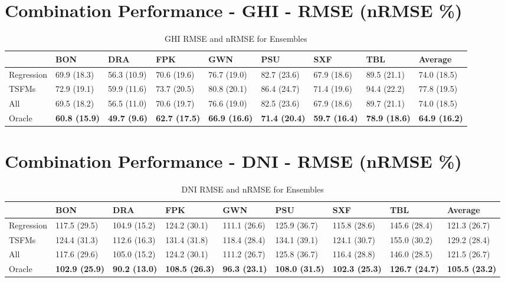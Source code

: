 \section*{Combination Performance - GHI - RMSE (nRMSE \%)}
\begin{table}
\caption{GHI RMSE and nRMSE for Ensembles}
\begin{tabular}{lllllllll}
\toprule
 & BON & DRA & FPK & GWN & PSU & SXF & TBL & Average \\
\midrule
Regression & 69.9 (18.3) & 56.3 (10.9) & 70.6 (19.6) & 76.7 (19.0) & 82.7 (23.6) & 67.9 (18.6) & 89.5 (21.1) & 74.0 (18.5) \\
TSFMs & 72.9 (19.1) & 59.9 (11.6) & 73.7 (20.5) & 80.8 (20.1) & 86.4 (24.7) & 71.4 (19.6) & 94.4 (22.2) & 77.8 (19.5) \\
All & 69.5 (18.2) & 56.5 (11.0) & 70.6 (19.7) & 76.6 (19.0) & 82.5 (23.6) & 67.9 (18.6) & 89.7 (21.1) & 74.0 (18.5) \\
Oracle & \textbf{60.8 (15.9)} & \textbf{49.7 (9.6)} & \textbf{62.7 (17.5)} & \textbf{66.9 (16.6)} & \textbf{71.4 (20.4)} & \textbf{59.7 (16.4)} & \textbf{78.9 (18.6)} & \textbf{64.9 (16.2)} \\
\bottomrule
\end{tabular}
\end{table}

\vspace{1cm}

\section*{Combination Performance - DNI - RMSE (nRMSE \%)}
\begin{table}
\caption{DNI RMSE and nRMSE for Ensembles}
\begin{tabular}{lllllllll}
\toprule
 & BON & DRA & FPK & GWN & PSU & SXF & TBL & Average \\
\midrule
Regression & 117.5 (29.5) & 104.9 (15.2) & 124.2 (30.1) & 111.1 (26.6) & 125.9 (36.7) & 115.8 (28.6) & 145.6 (28.4) & 121.3 (26.7) \\
TSFMs & 124.4 (31.3) & 112.6 (16.3) & 131.4 (31.8) & 118.4 (28.4) & 134.1 (39.1) & 124.1 (30.7) & 155.0 (30.2) & 129.2 (28.4) \\
All & 117.6 (29.6) & 105.0 (15.2) & 124.2 (30.1) & 111.2 (26.7) & 125.8 (36.7) & 116.4 (28.8) & 146.0 (28.5) & 121.5 (26.7) \\
Oracle & \textbf{102.9 (25.9)} & \textbf{90.2 (13.0)} & \textbf{108.5 (26.3)} & \textbf{96.3 (23.1)} & \textbf{108.0 (31.5)} & \textbf{102.3 (25.3)} & \textbf{126.7 (24.7)} & \textbf{105.5 (23.2)} \\
\bottomrule
\end{tabular}
\end{table}

